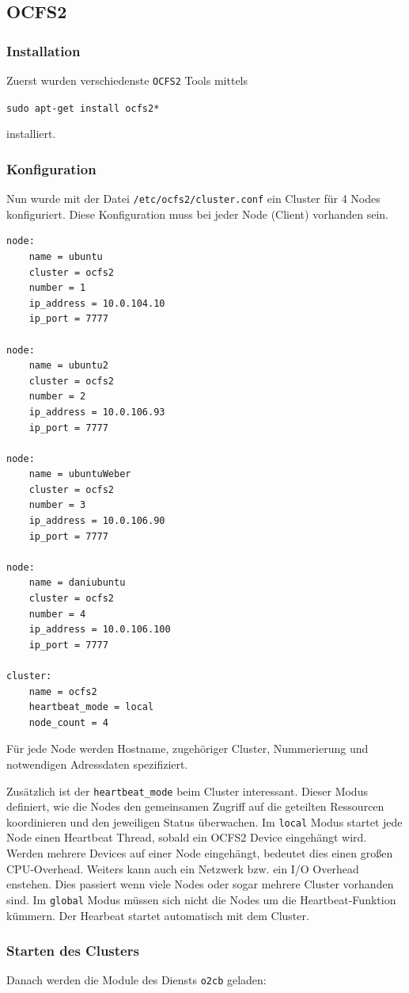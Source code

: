 \subsection{OCFS2}
\subsubsection{Installation}
Zuerst wurden verschiedenste \texttt{OCFS2} Tools mittels

\texttt{sudo apt-get install ocfs2*}

installiert.\clearpage
\subsubsection{Konfiguration}
Nun wurde mit der Datei \texttt{/etc/ocfs2/cluster.conf} ein Cluster für 4 Nodes konfiguriert. Diese Konfiguration muss bei jeder Node (Client) vorhanden sein.
\begin{lstlisting}[style=bash, caption=\texttt{/etc/ocfs2/cluster.conf}]
node:
	name = ubuntu
	cluster = ocfs2
	number = 1
	ip_address = 10.0.104.10
	ip_port = 7777

node:
	name = ubuntu2
	cluster = ocfs2
	number = 2
	ip_address = 10.0.106.93
	ip_port = 7777

node:
	name = ubuntuWeber
	cluster = ocfs2
	number = 3
	ip_address = 10.0.106.90
	ip_port = 7777

node:
	name = daniubuntu
	cluster = ocfs2
	number = 4
	ip_address = 10.0.106.100
	ip_port = 7777

cluster:
	name = ocfs2
	heartbeat_mode = local
	node_count = 4

\end{lstlisting}
Für jede Node werden Hostname, zugehöriger Cluster, Nummerierung und notwendigen Adressdaten spezifiziert.

Zusätzlich ist der \texttt{heartbeat\_mode} beim Cluster interessant. Dieser Modus definiert, wie die Nodes den gemeinsamen Zugriff auf die geteilten Ressourcen koordinieren und den jeweiligen Status überwachen. Im \texttt{local} Modus startet jede Node einen Heartbeat Thread, sobald ein OCFS2 Device eingehängt wird. Werden mehrere Devices auf einer Node eingehängt, bedeutet dies einen großen CPU-Overhead. Weiters kann auch ein Netzwerk bzw. ein I/O Overhead enstehen. Dies passiert wenn viele Nodes oder sogar mehrere Cluster vorhanden sind. Im \texttt{global} Modus müssen sich nicht die Nodes um die Heartbeat-Funktion kümmern. Der Hearbeat startet automatisch mit dem Cluster. \cite{heartbeat}
\clearpage
\subsubsection{Starten des Clusters}
Danach werden die Module des Diensts \texttt{o2cb} geladen:

